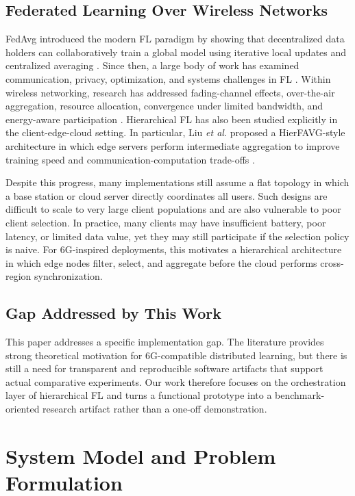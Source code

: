 \documentclass[conference]{IEEEtran}
\begin{document}
\subsection{Federated Learning Over Wireless Networks}
FedAvg introduced the modern FL paradigm by showing that decentralized data holders can collaboratively train a global model using iterative local updates and centralized averaging \cite{mcmahan2017fedavg}. Since then, a large body of work has examined communication, privacy, optimization, and systems challenges in FL \cite{kairouz2021advances}. Within wireless networking, research has addressed fading-channel effects, over-the-air aggregation, resource allocation, convergence under limited bandwidth, and energy-aware participation \cite{amiri2020wireless,chen2021joint,yang2021energy}. Hierarchical FL has also been studied explicitly in the client-edge-cloud setting. In particular, Liu \emph{et al.} proposed a HierFAVG-style architecture in which edge servers perform intermediate aggregation to improve training speed and communication-computation trade-offs \cite{liu2020hierfavg}.

Despite this progress, many implementations still assume a flat topology in which a base station or cloud server directly coordinates all users. Such designs are difficult to scale to very large client populations and are also vulnerable to poor client selection. In practice, many clients may have insufficient battery, poor latency, or limited data value, yet they may still participate if the selection policy is naive. For 6G-inspired deployments, this motivates a hierarchical architecture in which edge nodes filter, select, and aggregate before the cloud performs cross-region synchronization.

\subsection{Gap Addressed by This Work}
This paper addresses a specific implementation gap. The literature provides strong theoretical motivation for 6G-compatible distributed learning, but there is still a need for transparent and reproducible software artifacts that support actual comparative experiments. Our work therefore focuses on the orchestration layer of hierarchical FL and turns a functional prototype into a benchmark-oriented research artifact rather than a one-off demonstration.

\section{System Model and Problem Formulation}
\end{document}
